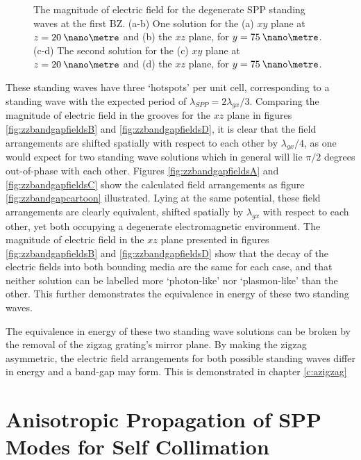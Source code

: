 \begin{figure}
\begin{center}
	\end{center}	
\caption[The magnitude of electric field for the degenerate SPP standing waves at the first BZ. ($xy$ and $xz$ plane)]{The magnitude of electric field for the degenerate SPP standing waves at the first BZ. (a-b) One solution for the (a) $xy$ plane at $z=20\:\nano\metre$ and (b) the $xz$ plane, for $y=75\:\nano\metre$. (c-d) The second solution for the (c) $xy$ plane at $z=20\:\nano\metre$ and (d) the $xz$ plane, for $y=75\:\nano\metre$. \label{fig:zzbandgapfields}}
\end{figure}
These standing waves have three `hotspots' per unit cell, corresponding to a standing wave with the expected period of $\lambda_{SPP}=2\lambda_{gx}/3$. Comparing the magnitude of electric field in the grooves for the $xz$ plane in figures \ref{fig:zzbandgapfieldsB} and \ref{fig:zzbandgapfieldsD}, it is clear that the field arrangements are shifted spatially with respect to each other by $\lambda_{gx}/4$, as one would expect for two standing wave solutions which in general will lie $\pi/2$ degrees out-of-phase with each other. Figures \ref{fig:zzbandgapfieldsA} and \ref{fig:zzbandgapfieldsC} show the calculated field arrangements as figure \ref{fig:zzbandgapcartoon} illustrated. Lying at the same potential, these field arrangements are clearly equivalent, shifted spatially by $\lambda_{gx}$ with respect to each other, yet both occupying a degenerate electromagnetic environment. The magnitude of electric field in the $xz$ plane presented in figures \ref{fig:zzbandgapfieldsB} and \ref{fig:zzbandgapfieldsD} show that the decay of the electric fields into both bounding media are the same for each case, and that neither solution can be labelled more `photon-like' nor `plasmon-like' than the other. This further demonstrates the equivalence in energy of these two standing waves.

The equivalence in energy of these two standing wave solutions can be broken by the removal of the zigzag grating's mirror plane. By making the zigzag asymmetric, the electric field arrangements for both possible standing waves differ in energy and a band-gap may form. This is demonstrated in chapter \ref{c:azigzag}



\section{Anisotropic Propagation of SPP Modes for Self Collimation\label{sec:anisotropic}}

